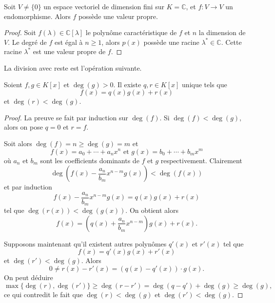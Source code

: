 \begin{corollary}
  \label{co:10}
  Soit $V ≠ \{0\}$ un espace vectoriel de dimension fini sur $K = ℂ$, et $f: V → V$ un endomorphisme. Alors $f$ possède une valeur propre. 
\end{corollary}
\begin{proof}
  Soit $f(λ) ∈ ℂ[λ]$ le polynôme caractéristique de $f$ et $n$ la dimension de $V$. Le degré de $f$ est égal à $n≥1$, alors $p(x)$ possède une racine $λ^* ∈ℂ$. Cette racine $λ^*$  est une valeur propre de $f$. 
\end{proof}


La division avec reste est l'opération suivante. 

\begin{theorem}
  \label{thr:33}
  Soient $f,g \in K[x]$ et $\deg(g) >0$. Il existe $q,r \in K[x]$ unique  tels que 
  \begin{displaymath}
    f(x) = q(x) g(x) + r(x) 
  \end{displaymath}
  et $\deg(r) < \deg(g)$. 
\end{theorem}


\begin{proof}
  La preuve se fait par induction sur $\deg(f)$. Si $\deg(f) < \deg(g)$, alors on pose $q = 0$ et $r = f$.

Soit alors $\deg(f) = n \geq \deg(g)=m$ et 
\begin{displaymath}
  f(x) = a_0+ \cdots +a_n x^n \text{ et } g(x) = b_0 + \cdots + b_m x^m 
\end{displaymath}
où $a_n$ et $b_m$ sont les coefficients dominants de $f$ et $g$ respectivement. 
Clairement 
\begin{displaymath}
  \deg\left( f(x) - \frac{a_n}{ b_m } x^{n-m} g(x) \right) < \deg(f(x))
\end{displaymath}
et par induction 
\begin{displaymath}
  f(x) - \frac{a_n}{ b_m } x^{n-m} g(x)  = q(x) g(x) + r(x) 
\end{displaymath}
tel que $\deg(r(x)) < \deg(g(x))$. On  obtient alors
\begin{displaymath}
  f(x) = \left(q(x) + \frac{a_n}{ b_m } x^{n-m} \right) g(x) + r(x). 
\end{displaymath}

Supposons maintenant qu'il existent autres polynômes $q'(x)$ et $r'(x)$ tel que 
\begin{displaymath}
    f(x) = q'(x) g(x) + r'(x) 
  \end{displaymath}
  et $\deg(r') < \deg(g)$. 
Alors 
\begin{displaymath}
0 \neq   r(x) - r'(x) = (q(x) - q'(x)) ⋅ g(x). 
\end{displaymath}
On peut déduire 
\begin{displaymath}
\max\{\deg(r),\deg(r')\} \geq   \deg( r - r')  = \deg(q - q') + \deg(g) \geq \deg(g), 
\end{displaymath}
ce qui contredit le fait que $\deg(r) < \deg(g)$ et $\deg(r') < \deg(g)$. 
\end{proof}


